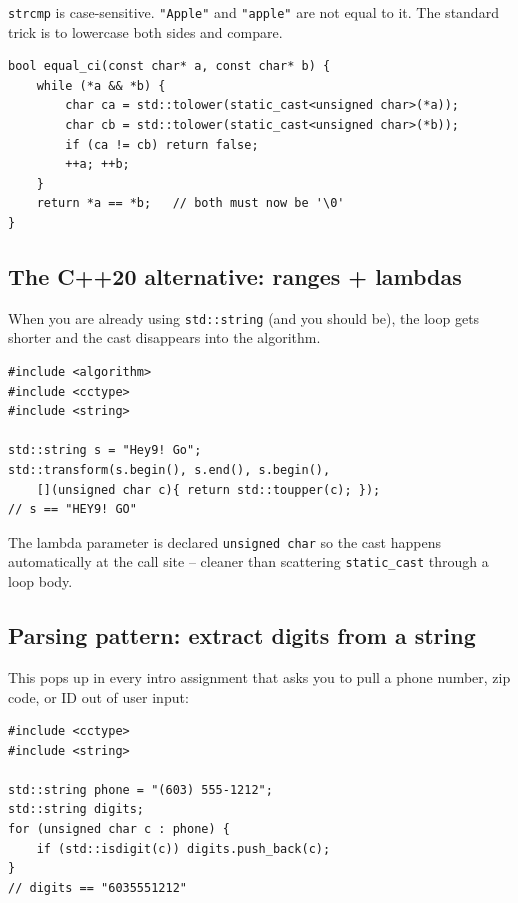 \documentclass[11pt]{article}
\begin{document}
\texttt{strcmp} is case-sensitive. \texttt{"Apple"} and
\texttt{"apple"} are not equal to it. The standard trick is to
lowercase both sides and compare.

\begin{examplebox}
\begin{verbatim}
bool equal_ci(const char* a, const char* b) {
    while (*a && *b) {
        char ca = std::tolower(static_cast<unsigned char>(*a));
        char cb = std::tolower(static_cast<unsigned char>(*b));
        if (ca != cb) return false;
        ++a; ++b;
    }
    return *a == *b;   // both must now be '\0'
}
\end{verbatim}
\end{examplebox}

\subsection{The C++20 alternative: ranges + lambdas}

When you are already using \texttt{std::string} (and you should be),
the loop gets shorter and the cast disappears into the algorithm.

\begin{examplebox}
\begin{verbatim}
#include <algorithm>
#include <cctype>
#include <string>

std::string s = "Hey9! Go";
std::transform(s.begin(), s.end(), s.begin(),
    [](unsigned char c){ return std::toupper(c); });
// s == "HEY9! GO"
\end{verbatim}
The lambda parameter is declared \texttt{unsigned char} so the cast
happens automatically at the call site -- cleaner than scattering
\texttt{static\_cast} through a loop body.
\end{examplebox}

\subsection{Parsing pattern: extract digits from a string}

This pops up in every intro assignment that asks you to pull a phone
number, zip code, or ID out of user input:

\begin{examplebox}
\begin{verbatim}
#include <cctype>
#include <string>

std::string phone = "(603) 555-1212";
std::string digits;
for (unsigned char c : phone) {
    if (std::isdigit(c)) digits.push_back(c);
}
// digits == "6035551212"
\end{verbatim}
\end{examplebox}
\end{document}
